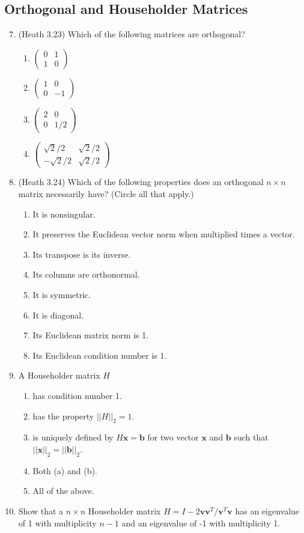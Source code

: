 \documentclass{article}
\renewcommand{\vec}[1]{\mathbf{#1}}
\newcommand{\x}{\vec{x}}
\renewcommand{\b}{\vec{b}}
\renewcommand{\v}{\vec{v}}
\begin{document}
\subsection*{Orthogonal and Householder Matrices}

\begin{enumerate}
\setcounter{enumi}{6}

\item (Heath 3.23) Which of the following matrices are orthogonal?
\begin{enumerate}
\item $\begin{pmatrix} 0 & 1 \\ 1 & 0 \end{pmatrix}$
\item $\begin{pmatrix} 1 & 0 \\ 0 & -1 \end{pmatrix}$
\item $\begin{pmatrix} 2 & 0 \\ 0 & 1/2 \end{pmatrix}$
\item $\begin{pmatrix} \sqrt{2}/2 & \sqrt{2}/2 \\ -\sqrt{2}/2 & \sqrt{2}/2 \end{pmatrix}$
\end{enumerate}

\pagebreak

\item (Heath 3.24) Which of the following properties does an orthogonal $n \times n$ matrix necessarily have? (Circle all that apply.)
\begin{enumerate}
\item It is nonsingular.
\item It preserves the Euclidean vector norm when multiplied times a vector.
\item Its transpose is its inverse.
\item Its columns are orthonormal.
\item It is symmetric.
\item It is diagonal.
\item Its Euclidean matrix norm is 1.
\item Its Euclidean condition number is 1.
\end{enumerate}

\item A Householder matrix $H$
\begin{enumerate}
\item has condition number 1.
\item has the property $||H||_2 = 1$.
\item is uniquely defined by $H\x = \b$ for two vector $\x$ and $\b$ such that  $||\x||_2 = ||\b||_2$.
\item Both (a) and (b).
\item All of the above.
\end{enumerate}

\item Show that a $n \times n$ Householder matrix $H = I - 2 \v\v^T / \v^T\v$ has an eigenvalue of 1 with multiplicity $n-1$ and an eigenvalue
of -1 with multiplicity 1.

\end{enumerate}
\end{document}

